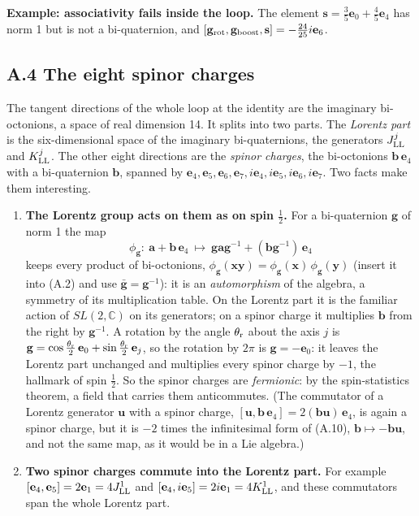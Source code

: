 \documentclass[
  10pt,
]{article}
\providecommand{\tightlist}{%
  \setlength{\itemsep}{0pt}\setlength{\parskip}{0pt}}
\begin{document}
\textbf{Example: associativity fails inside the loop.} The element
\(\mathbf s=\tfrac{3}{5}\mathbf e_{0}+\tfrac{4}{5}\mathbf e_{4}\) has
norm 1 but is not a bi-quaternion, and
\([\mathbf g_{\rm rot},\mathbf g_{\rm boost},\mathbf s]=-\tfrac{24}{25}i\mathbf e_{6}\).

\hypertarget{a.4-the-eight-spinor-charges}{%
\subsection{A.4 The eight spinor
charges}\label{a.4-the-eight-spinor-charges}}

The tangent directions of the whole loop at the identity are the
imaginary bi-octonions, a space of real dimension 14. It splits into two
parts. The \emph{Lorentz part} is the six-dimensional space of the
imaginary bi-quaternions, the generators \(J^j_{\rm LL}\) and
\(K^j_{\rm LL}\). The other eight directions are the \emph{spinor
charges}, the bi-octonions \(\mathbf b\,\mathbf e_4\) with a
bi-quaternion \(\mathbf b\), spanned by
\(\mathbf e_4,\mathbf e_5,\mathbf e_6,\mathbf e_7,i\mathbf e_4,i\mathbf e_5,i\mathbf e_6,i\mathbf e_7\).
Two facts make them interesting.

\begin{enumerate}
\def\labelenumi{\arabic{enumi}.}
\tightlist
\item
  \textbf{The Lorentz group acts on them as on spin \(\tfrac12\).} For a
  bi-quaternion \(\mathbf g\) of norm 1 the map
  \[\phi_{\mathbf g}:\ \mathbf a+\mathbf b\,\mathbf e_4\ \mapsto\ \mathbf g\mathbf a\mathbf g^{-1}+(\mathbf b\mathbf g^{-1})\,\mathbf e_4\tag{A.10}\]
  keeps every product of bi-octonions,
  \(\phi_{\mathbf g}(\mathbf x\mathbf y)=\phi_{\mathbf g}(\mathbf x)\,\phi_{\mathbf g}(\mathbf y)\)
  (insert it into (A.2) and use \(\bar{\mathbf g}=\mathbf g^{-1}\)): it
  is an \emph{automorphism} of the algebra, a symmetry of its
  multiplication table. On the Lorentz part it is the familiar action of
  \(SL(2,\mathbb C)\) on its generators; on a spinor charge it
  multiplies \(\mathbf b\) from the right by \(\mathbf g^{-1}\). A
  rotation by the angle \(\theta_{\rm r}\) about the axis \(j\) is
  \(\mathbf g=\cos\tfrac{\theta_{\rm r}}2\,\mathbf e_0+\sin\tfrac{\theta_{\rm r}}2\,\mathbf e_j\),
  so the rotation by \(2\pi\) is \(\mathbf g=-\mathbf e_0\): it leaves
  the Lorentz part unchanged and multiplies every spinor charge by
  \(-1\), the hallmark of spin \(\tfrac12\). So the spinor charges are
  \emph{fermionic}: by the spin-statistics theorem, a field that carries
  them anticommutes. (The commutator of a Lorentz generator
  \(\mathbf u\) with a spinor charge,
  \([\mathbf u,\mathbf b\,\mathbf e_4]=2(\mathbf b\mathbf u)\,\mathbf e_4\),
  is again a spinor charge, but it is \(-2\) times the infinitesimal
  form of (A.10), \(\mathbf b\mapsto-\mathbf b\mathbf u\), and not the
  same map, as it would be in a Lie algebra.)
\item
  \textbf{Two spinor charges commute into the Lorentz part.} For example
  \([\mathbf e_4,\mathbf e_5]=2\mathbf e_{1}=4J^1_{\rm LL}\) and
  \([\mathbf e_4,i\mathbf e_5]=2i\mathbf e_{1}=4K^1_{\rm LL}\), and
  these commutators span the whole Lorentz part.
\end{enumerate}
\end{document}
